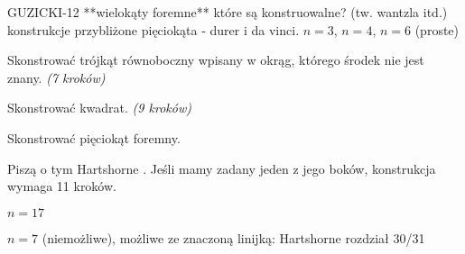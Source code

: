 GUZICKI-12 **wielokąty foremne** które są konstruowalne? (tw. wantzla itd.) konstrukcje przybliżone pięciokąta - durer i da vinci.
$n = 3$, $n = 4$, $n = 6$ (proste)

\begin{problem}
    Skonstrować trójkąt równoboczny wpisany w okrąg, którego środek nie jest znany. \hfill \emph{(7 kroków)}
\end{problem}

\begin{problem}
    Skonstrować kwadrat. \hfill \emph{(9 kroków)}
\end{problem}

\begin{problem}
    Skonstrować pięciokąt foremny.
\end{problem}

Piszą o tym Hartshorne \cite[s. 45-49]{hartshorne2000}.
Jeśli mamy zadany jeden z jego boków, konstrukcja wymaga 11 kroków. %




$n = 17$

$n = 7$ (niemożliwe), możliwe ze znaczoną linijką: Hartshorne rozdział 30/31
